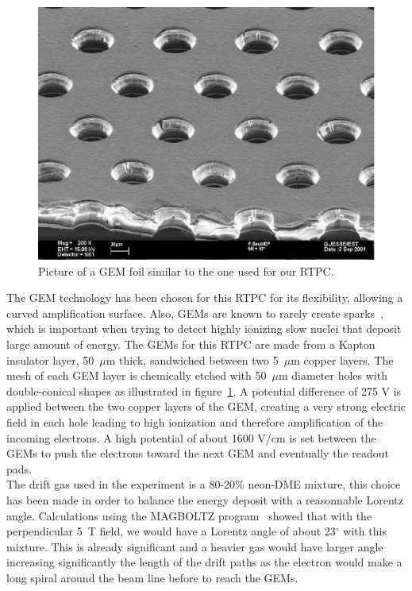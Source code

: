 \documentclass[twocolumn,showpacs,superscriptaddress,groupedaddress]{revtex4}
\begin{document}
\begin{figure}[tbp]
\centering
\includegraphics[scale=0.70]{fig/GEM_photo.jpg}
\caption{Picture of a GEM foil similar to the one used for our RTPC.} 
\label{fig:GEMs}
\end{figure}

The GEM technology has been chosen for this RTPC for its flexibility, 
allowing a curved amplification surface. Also, GEMs are known to rarely create 
sparks~\cite{GEM_ref}, which is important when trying to detect 
highly ionizing slow nuclei that deposit large amount of energy. The GEMs for 
this RTPC are made from a Kapton insulator layer, 50~$\mu$m 
thick, sandwiched between two 5~$\mu$m copper layers. The mesh of each GEM 
layer is chemically etched with 50~$\mu$m diameter holes with double-conical 
shapes as illustrated in figure~\ref{fig:GEMs}. A potential difference of 275 V 
is applied between the two 
copper layers of the GEM, creating a very strong electric field in each hole 
leading to high ionization and therefore amplification of the incoming 
electrons. A high potential of about 1600 V/cm is set between 
the GEMs to push the electrons toward the next GEM and eventually the readout 
pads. \\

The drift gas used in the experiment is a 80-20\% neon-DME mixture, this choice 
has been made in order to balance the energy deposit with a reasonnable
Lorentz angle. Calculations using the MAGBOLTZ program~\cite{MAGBOLTZ} 
showed that with the perpendicular 5~T field, we would have a Lorentz angle of 
about 23$^\circ$ with this mixture. This is already significant and a heavier
gas would have larger angle increasing significantly
the length of the drift paths as the electron would 
make a long spiral around the beam line before to reach the GEMs. 
\end{document}
